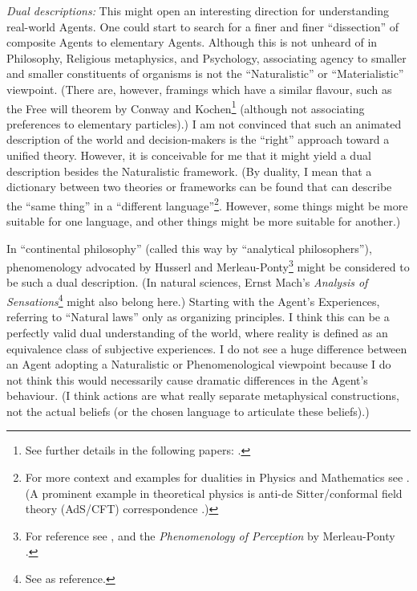 \documentclass{article}
\begin{document}
{\it Dual descriptions:}
This might open an interesting direction for understanding real-world Agents. One could start to search for a finer and finer ``dissection'' of composite Agents to elementary Agents. Although this is not unheard of in Philosophy, Religious metaphysics, and Psychology, associating agency to smaller and smaller constituents of organisms is not the ``Naturalistic'' or ``Materialistic'' viewpoint.
(There are, however, framings which have a similar flavour, such as the Free will theorem by Conway and Kochen\footnote{See further details in the following papers: \cite{paper:ConwayKochen2006,arxiv:ConwayKochen2008}.} (although not associating preferences to elementary particles).)
I am not convinced that such an animated description of the world and decision-makers is the ``right'' approach toward a unified theory. However, it is conceivable for me that it might yield a dual description besides the Naturalistic framework. (By duality, I mean that a dictionary between two theories or frameworks can be found that can describe the ``same thing'' in a ``different language''\footnote{For more context and examples for dualities in Physics and Mathematics see \cite{nlab:Duality}. (A prominent example in theoretical physics is anti-de Sitter/conformal field theory (AdS/CFT) correspondence \cite{arxiv:Polchinski2015Dualities,paper:AdS/CFTIntegrability}.)}. However, some things might be more suitable for one language, and other things might be more suitable for another.)

In ``continental philosophy'' (called this way by ``analytical philosophers''), phenomenology advocated by Husserl and Merleau-Ponty\footnote{For reference see \cite{sep:Phenomenology}, and the \emph{Phenomenology of Perception} by Merleau-Ponty \cite{book:PhenomenologyOfPerception}.} might be considered to be such a dual description. (In natural sciences, Ernst Mach’s \emph{Analysis of Sensations}\footnote{See \cite{sep:ErnstMach,book:AnalysisOfSensations} as reference.} might also belong here.) Starting with the Agent's Experiences, referring to ``Natural laws'' only as organizing principles. I think this can be a perfectly valid dual understanding of the world, where reality is defined as an equivalence class of subjective experiences.
I do not see a huge difference between an Agent adopting a Naturalistic or Phenomenological viewpoint because I do not think this would necessarily cause dramatic differences in the Agent’s behaviour.
(I think actions are what really separate metaphysical constructions, not the actual beliefs (or the chosen language to articulate these beliefs).)
\end{document}
